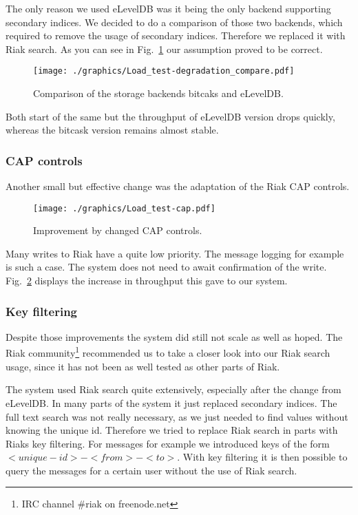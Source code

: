 \documentclass[11pt,a4paper]{report}
\begin{document}
The only reason we used eLevelDB was it being the only backend supporting secondary indices.
We decided to do a comparison of those two backends,
which required to remove the usage of secondary indices.
Therefore we replaced it with Riak search.
As you can see in Fig.~\ref{fig:load_test:degradation_compare} our assumption proved to be correct.
\begin{figure}[htbp!]
 \hspace{-2.5cm}
 \texttt{[image: ./graphics/Load\_test-degradation\_compare.pdf]}
 \caption{Comparison of the storage backends bitcaks and eLevelDB.}
 \label{fig:load_test:degradation_compare}
\end{figure}
Both start of the same but the throughput of eLevelDB version drops quickly,
whereas the bitcask version remains almost stable.

\subsubsection{CAP controls}
Another small but effective change was the adaptation of the Riak CAP controls.
\begin{figure}[htbp!]
 \hspace{-2.5cm}
 \texttt{[image: ./graphics/Load\_test-cap.pdf]}
 \caption{Improvement by changed CAP controls.}
 \label{fig:load_test:cap}
\end{figure}
Many writes to Riak have a quite low priority.
The message logging for example is such a case.
The system does not need to await confirmation of the write.
Fig.~\ref{fig:load_test:cap} displays the increase in throughput this gave to our system.


\subsubsection{Key filtering}
\label{sec:load_tests:key_filtering}
Despite those improvements the system did still not scale as well as hoped.
The Riak community\footnote{IRC channel \#riak on freenode.net} recommended
us to take a closer look into our Riak search usage,
since it has not been as well tested as other parts of Riak.

The system used Riak search quite extensively, especially after the change from eLevelDB.
In many parts of the system it just replaced secondary indices.
The full text search was not really necessary, as we just needed to find values
without knowing the unique id.
Therefore we tried to replace Riak search in parts with Riaks key filtering.
For messages for example we introduced keys of the form $<unique-id>-<from>-<to>$.
With key filtering it is then possible to query the messages for a certain user without
the use of Riak search.
\end{document}
